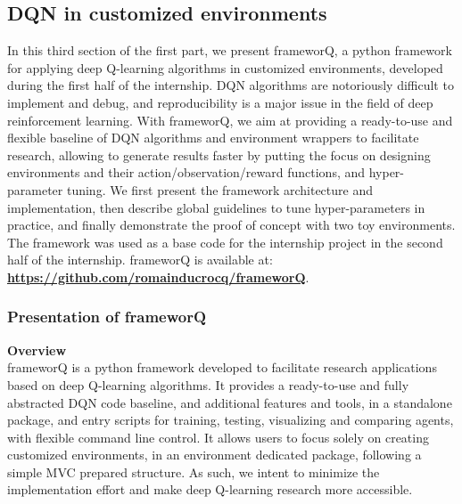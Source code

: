 \subsection{DQN in customized environments}

In this third section of the first part, we present frameworQ, a python framework for applying deep Q-learning algorithms in customized environments, developed during the first half of the internship. DQN algorithms are notoriously difficult to implement and debug, and reproducibility is a major issue in the field of deep reinforcement learning. With frameworQ, we aim at providing a ready-to-use and flexible baseline of DQN algorithms and environment wrappers to facilitate research, allowing to generate results faster by putting the focus on designing environments and their action/observation/reward functions, and hyper-parameter tuning. We first present the framework architecture and implementation, then describe global guidelines to tune hyper-parameters in practice, and finally demonstrate the proof of concept with two toy environments. The framework was used as a base code for the internship project in the second half of the internship. frameworQ is available at: \textbf{\url{https://github.com/romainducrocq/frameworQ}}.

\subsubsection{Presentation of frameworQ} \label{basics}

\textbf{Overview} \\
frameworQ is a python framework developed to facilitate research applications based on deep Q-learning algorithms. It provides a ready-to-use and fully abstracted DQN code baseline, and additional features and tools, in a standalone package, and entry scripts for training, testing, visualizing and comparing agents, with flexible command line control. It allows users to focus solely on creating customized environments, in an environment dedicated package, following a simple MVC prepared structure. As such, we intent to minimize the implementation effort and make deep Q-learning research more accessible. \\

